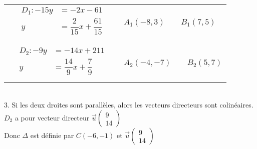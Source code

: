 \begin{tabular}{llll}
      &   \begin{minipage}{3cm}
            \begin{equation*} \begin{aligned}
 D_1 :     -15y    &= -2x -61\\
                   y    &=\dfrac{2}{15}x +\dfrac{61}{15}\\
             \end{aligned} \end{equation*}
              \end{minipage} 
                       & \hspace*{2cm} 
                          & $A_1(-8,3) \qquad B_1(7,5) $\\
  &   & &  \\       
& \begin{minipage}{3cm} 
          \begin{equation*} \begin{aligned}
D_2 :     -9y   &= -14x +211\\
                y   &=\dfrac{14}{9}x +\dfrac{7}{9}\\
          \end{aligned} \end{equation*}
          \end{minipage} 
                   & \hspace*{2cm} 
                      & $A_2(-4,-7) \qquad B_2(5,7) $ \\
\end{tabular}\\

3. Si les deux droites sont parallèles, alors les vecteurs directeurs sont colinéaires.\\

$D_2$ a pour vecteur directeur $\vec{u} \left( \begin{array}{c}
            9\\
            14
        \end{array} \right) $\\

Donc $\Delta$ est définie par $C(-6,-1)$ et         
$ \vec{u} \left( \begin{array}{c}
            9\\
            14
        \end{array} \right)$
     
